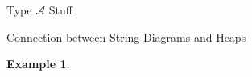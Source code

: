 \documentclass[11pt]{amsart}
\theoremstyle{definition}
\newtheorem{example}[theorem]{Example}
\numberwithin{equation}{section}
\newcommand{\A}{\mathcal{A}}
\renewcommand{\(}{\left(}
\renewcommand{\)}{\right)}
\newcommand{\w}{\mathsf{w}}
\begin{document}
\begin{section}{Type $\A$ Stuff}
\begin{subsection}{Connection between String Diagrams and Heaps}
\begin{example}
\end{example}
%
%
% 	

\end{subsection}
\end{section}
\end{document}
